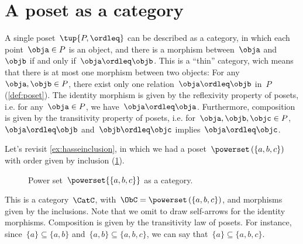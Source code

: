 

\section{A poset as a category}
\label{sec:posetsarecats}
A single poset~$\tup{P, \ordleq}$ can be described as a category, in which each point~$\obja\in P$ is an object, and there is a morphism between~$\obja$ and~$\objb$ if and only if~$\obja \ordleq \objb$. This is a ``thin'' category, wich means that there is at most one morphism
between two objects: For any~$\obja,\objb\in P$, there exist only one relation~$\obja\ordleq \objb$ in~$P$ (\cref{def:poset}). The identity morphism is given by the reflexivity property of posets, i.e. for any~$\obja\in P$, we have~$\obja \ordleq \obja$. Furthermore, composition is given by the transitivity property of posets, i.e. for~$\obja,\objb,\objc \in P$,~$\obja\ordleq \objb$ and~$\objb\ordleq \objc$ implies~$\obja\ordleq \objc$.

\begin{example}
Let's revisit \cref{ex:hasseinclusion}, in which we had a poset~$\powerset\left(\{a,b,c\}\right)$ with order given by inclusion (\cref{fig:posetascat}).
\begin{figure}[h!]
\begin{center}
\end{center}
\caption{Power set~$\powerset{\{a,b,c\}}$ as a category. \label{fig:posetascat}}
\end{figure}
This is a category~$\CatC$, with~$\ObC=\powerset\left(\{a,b,c\}\right)$, and morphisms given by the inclusions. Note that we omit to draw self-arrows for the identity morphisms. Composition is given by the transitivity law of posets. For instance, since~$\{a\}\subseteq \{a,b\}$ and~$\{a,b\} \subseteq \{a,b,c\}$, we can say that~$\{a\}\subseteq \{a,b,c\}$.
\end{example}

